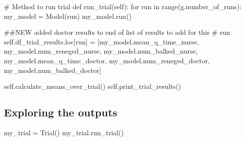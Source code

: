 \documentclass[
  letterpaper,
  DIV=11,
  numbers=noendperiod]{scrreprt}
\newenvironment{Shaded}{}{}
\newcommand{\BuiltInTok}[1]{\textcolor[rgb]{0.84,0.23,0.29}{#1}}
\newcommand{\CommentTok}[1]{\textcolor[rgb]{0.42,0.45,0.49}{#1}}
\newcommand{\ControlFlowTok}[1]{\textcolor[rgb]{0.84,0.23,0.29}{#1}}
\newcommand{\KeywordTok}[1]{\textcolor[rgb]{0.84,0.23,0.29}{#1}}
\newcommand{\NormalTok}[1]{\textcolor[rgb]{0.14,0.16,0.18}{#1}}
\newcommand{\OperatorTok}[1]{\textcolor[rgb]{0.14,0.16,0.18}{#1}}
\newcommand{\VariableTok}[1]{\textcolor[rgb]{0.89,0.38,0.04}{#1}}
\begin{document}
\begin{tcolorbox}
\begin{Shaded}
\begin{Highlighting}[]
    \CommentTok{\# Method to run trial}
    \KeywordTok{def}\NormalTok{ run\_trial(}\VariableTok{self}\NormalTok{):}
        \ControlFlowTok{for}\NormalTok{ run }\KeywordTok{in} \BuiltInTok{range}\NormalTok{(g.number\_of\_runs):}
\NormalTok{            my\_model }\OperatorTok{=}\NormalTok{ Model(run)}
\NormalTok{            my\_model.run()}

            \CommentTok{\#\#NEW added doctor results to end of list of results to add for this}
            \CommentTok{\# run}
            \VariableTok{self}\NormalTok{.df\_trial\_results.loc[run] }\OperatorTok{=}\NormalTok{ [my\_model.mean\_q\_time\_nurse,}
\NormalTok{                                              my\_model.num\_reneged\_nurse,}
\NormalTok{                                              my\_model.num\_balked\_nurse,}
\NormalTok{                                              my\_model.mean\_q\_time\_doctor,}
\NormalTok{                                              my\_model.num\_reneged\_doctor,}
\NormalTok{                                              my\_model.num\_balked\_doctor]}

        \VariableTok{self}\NormalTok{.calculate\_means\_over\_trial()}
        \VariableTok{self}\NormalTok{.print\_trial\_results()}
\end{Highlighting}
\end{Shaded}

\end{tcolorbox}

\subsection{Exploring the outputs}\label{exploring-the-outputs-2}

\begin{Shaded}
\begin{Highlighting}[]
\NormalTok{my\_trial }\OperatorTok{=}\NormalTok{ Trial()}
\NormalTok{my\_trial.run\_trial()}
\end{Highlighting}
\end{Shaded}
\end{document}
